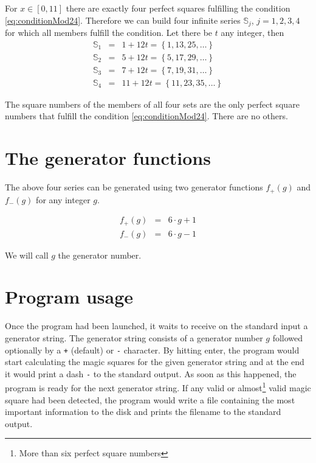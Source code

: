 \documentclass[reqno,10pt,a4paper]{article}
\begin{document}
	For $x \in [0, 11]$ there are exactly four perfect squares fulfilling the condition \eqref{eq:conditionMod24}. Therefore we can build four infinite series $\mathbb{S}_j$, $j = 1, 2, 3, 4$ for which all members fulfill the condition. Let there be $t$ any integer, then
	\begin{eqnarray}
		\mathbb{S}_1 &=& 1 + 12 t = \left\{ 1, 13, 25, \ldots \right\} \\
		\mathbb{S}_2 &=& 5 + 12 t = \left\{ 5, 17, 29, \ldots \right\} \\
		\mathbb{S}_3 &=& 7 + 12 t = \left\{ 7, 19, 31, \ldots \right\} \\
		\mathbb{S}_4 &=& 11 + 12 t = \left\{ 11, 23, 35, \ldots \right\}
	\end{eqnarray}
	
	The square numbers of the members of all four sets are the only perfect square numbers that fulfill the condition \eqref{eq:conditionMod24}. There are no others.
	
	
	\section{The generator functions}
	
	The above four series can be generated using two generator functions $f_+(g)$ and $f_-(g)$ for any integer $g$.
	
	\begin{eqnarray}
		f_+(g) &=& 6 \cdot g + 1 \label{eq:generatorFunctionPlus} \\
		f_-(g) &=& 6 \cdot g - 1 \label{eq:generatorFunctionMinus}
	\end{eqnarray}
	
	We will call $g$ the generator number.
	
	
	\section{Program usage}
	
	Once the program had been launched, it waits to receive on the standard input a generator string. The generator string consists of a generator number $g$ followed optionally by a \verb§+§ (default) or \verb§-§ character. By hitting enter, the program would start calculating the magic squares for the given generator string and at the end it would print a dash \verb§-§ to the standard output. As soon as this happened, the program is ready for the next generator string. If any valid or almost\footnote{More than six perfect square numbers} valid magic square had been detected, the program would write a file containing the most important information to the disk and prints the filename to the standard output.
	
\end{document}
